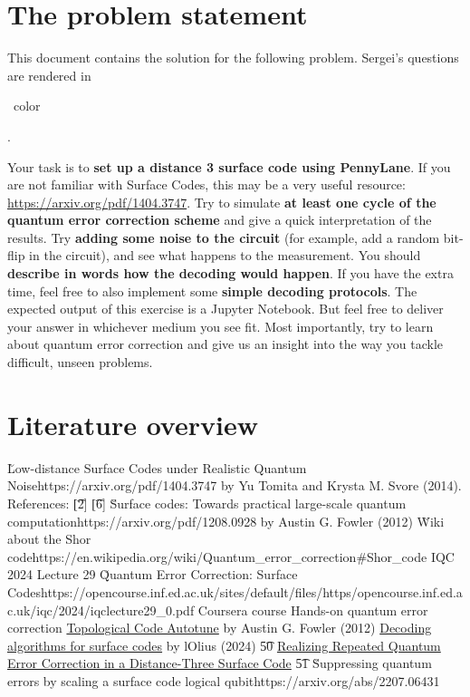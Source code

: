 \section{The problem statement}

This document contains the solution for the following problem. Sergei's questions are rendered in
\begin{\QuestionColor}\QuestionColorName\ color\end{\QuestionColor}.

\vsp

Your task is to \textbf{set up a distance 3 surface code using PennyLane}. If you are not familiar
with Surface Codes, this may be a very useful resource: \url{https://arxiv.org/pdf/1404.3747}. Try
to simulate \textbf{at least one cycle of the quantum error correction scheme} and give a quick
interpretation of the results. Try \textbf{adding some noise to the circuit} (for example, add a
random bit-flip in the circuit), and see what happens to the measurement. You should
\textbf{describe in words how the decoding would happen}. If you have the extra time, feel free to
also implement some \textbf{simple decoding protocols}. The expected output of this exercise is a
Jupyter Notebook. But feel free to deliver your answer in whichever medium you see fit. Most
importantly, try to learn about quantum error correction and give us an insight into the way you
tackle difficult, unseen problems.


\section{Literature overview}

\ls \u{Low-distance Surface Codes under Realistic Quantum Noise}{https://arxiv.org/pdf/1404.3747}
    by Yu Tomita and Krysta M. Svore (2014). References:
    \ls \t{[2]} 
    \li \t{[6]} \u{Surface codes: Towards practical large-scale quantum computation}{https://arxiv.org/pdf/1208.0928}
        by Austin G. Fowler (2012)
    \le
\li \u{Wiki about the Shor code}{https://en.wikipedia.org/wiki/Quantum_error_correction\#Shor_code}
\li IQC 2024 Lecture 29 \u{Quantum Error Correction: Surface Codes}{https://opencourse.inf.ed.ac.uk/sites/default/files/https/opencourse.inf.ed.ac.uk/iqc/2024/iqclecture29_0.pdf}
\li Coursera course Hands-on quantum error correction
    \ls \href{https://journals.aps.org/prx/pdf/10.1103/PhysRevX.2.041003}{Topological Code Autotune}
        by Austin G. Fowler (2012)
    \le
\li \href{https://arxiv.org/abs/2307.14989}{Decoding algorithms for surface codes} by lOlius (2024)
    \ls \t{50} \href{https://arxiv.org/abs/2112.03708}{Realizing Repeated Quantum Error Correction in a Distance-Three Surface Code}
    \li \t{51} \u{Suppressing quantum errors by scaling a surface code logical qubit}{https://arxiv.org/abs/2207.06431}
    \le
\li {}
\le


